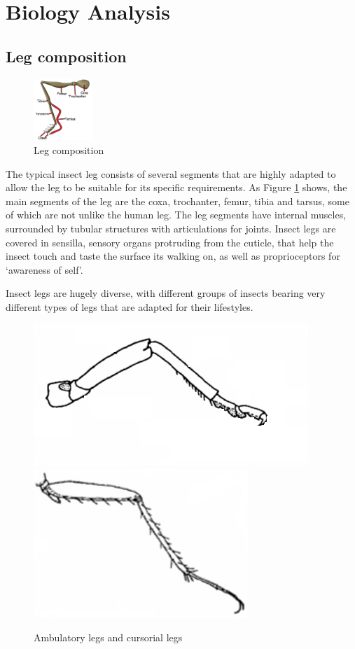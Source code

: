 \documentclass[conference]{IEEEtran}
\begin{document}
\section{Biology Analysis}\label{s2}

\subsection{Leg composition} 
\begin{figure}
    \centerline{\includegraphics[width=0.2\textwidth]{leg.png}}
    \caption{Leg composition}
    \label{fig8}
\end{figure}

The typical insect leg consists of several segments that are highly adapted to allow the leg to be suitable for its specific requirements. As Figure \ref{fig8} shows, the main segments of the leg are the coxa, trochanter, femur, tibia and tarsus, some of which are not unlike the human leg.\cite{b1} The leg segments have internal muscles, surrounded by tubular structures with articulations for joints. Insect legs are covered in sensilla, sensory organs protruding from the cuticle, that help the insect touch and taste the surface its walking on, as well as proprioceptors for ‘awareness of self’.\cite{b2}

Insect legs are hugely diverse, with different groups of insects bearing very different types of legs that are adapted for their lifestyles.

\begin{figure}
    \centering
    \includegraphics[scale=0.36,align=t]{leg1.png}
    \includegraphics[scale=0.35,align=t]{leg2.jpg}
    \caption{Ambulatory legs and cursorial legs}
    \label{fig9}
\end{figure}
\end{document}
